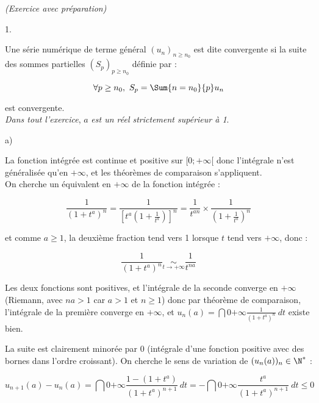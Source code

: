 \documentclass[11pt]{article}%
\begin{document}
 \begin{exercice}{\it (Exercice avec préparation)}~
 \begin{noliste}{1.}
 \setlength{\itemsep}{4mm}
 \item Une série numérique de terme général $(u_{n})_{ n \geq n_{0}}$
est dite convergente si la suite des sommes partielles $(S_{p})_{ p
\geq n_{0}}$ définie par : 
 
\[
 \forall p \geq n_{0}, \ S_{p} = \Sum{n = n_{0}}{p} u_{n} 
\]

 est convergente. \\

 \textit{Dans tout l'exercice}, $a$ \textit{est un réel strictement
supérieur à 1}. \\

 \item \begin{noliste}{a)}
 \setlength{\itemsep}{2mm}

 \item La fonction intégrée est continue et positive sur $[0 ; +
\infty[$ donc l'intégrale n'est généralisée qu'en $ + \infty$, et les
théorèmes de comparaison s'appliquent. \\

 On cherche un équivalent en $ + \infty$ de la fonction intégrée : 
 
\[
 \frac{ 1 }{ (1 + t^{a} )^{n} } = \frac{ 1 }{ \left[ t^{a} \left( 1 +
\frac{ 1 }{ t^{a} } \right) \right]^{n} } = \frac{ 1 }{ t^{ a n } }
\times \frac{ 1 }{ \left( 1 + \frac{ 1 }{ t^{a} } \right)^{n} } 
\]

 et comme $a \geq 1$, la deuxième fraction tend vers 1 lorsque $t$ tend
vers $ + \infty$, donc : 
 
\[
 \frac{ 1 }{ (1 + t^{a} )^{n} } \underset{ t \rightarrow + \infty }{
\sim } \frac{ 1 }{ t^{ n a } } 
\]

 Les deux fonctions sont positives, et l'intégrale de la seconde
converge en $ + \infty$ (Riemann, avec $n a > 1$ car $a >1$ et $n \geq
1$) donc par théorème de comparaison, l'intégrale de la première
converge en $ + \infty$, et $u_{n} (a) = \dint{0}{+ \infty} \frac{ 1 }{
(1 + t^{a} )^{n} } \ dt $ existe bien. \\

 \item La suite est clairement minorée par 0 (intégrale d'une fonction
positive avec des bornes dans l'ordre croissant). On cherche le sens de
variation de $(u_{n} (a) )_{n} \in \N^*$ : 
 
\[
 u_{n + 1} (a) - u_{n} (a) = \dint{0}{+ \infty} \frac{ 1 - (1 + t^{a} )
}{ (1 + t^{a})^{n + 1} } \ dt = - \dint{0}{+ \infty} \frac{ t^{a} }{ (1
+ t^{a})^{n + 1} } \ dt \leq 0 
\]


\end{noliste}
\end{noliste}
\end{exercice}
\end{document}
